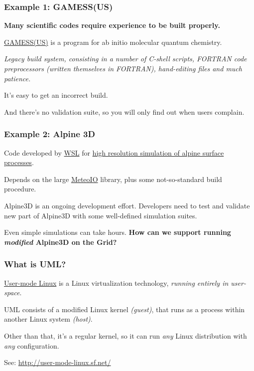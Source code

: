 \documentclass{beamer}
\begin{document}
\begin{frame}
  \frametitle{Example 1: GAMESS(US)}
  \label{sec:3}
  
  \textbf{Many scientific codes require experience to be built properly.}

  \+
  \href{http://www.msg.ameslab.gov/gamess/}{GAMESS(US)} is a program
  for ab initio molecular quantum chemistry.

  \+
  \emph{Legacy build system, consisting in a number of C-shell scripts,
  FORTRAN code preprocessors (written themselves in FORTRAN),
  hand-editing files and much patience.}

  \+
  It's easy to get an incorrect build.

  \+
  And there's no validation suite, so you will only find out when
  users complain.
\end{frame}






\begin{frame}
  \frametitle{Example 2: Alpine 3D}
  \label{sec:5}
  
  Code developed by \href{http://www.wsl.ch/}{WSL} for
  \href{http://www.slf.ch/ueber/organisation/schnee_permafrost/projekte/Alpine/index_EN}
  {high resolution simulation of alpine surface processes}.

  \+
  Depends on the large
  \href{http://www.slideshare.net/GEOFRAMEcafe/meteo-io-introduction}{MeteoIO}
  library, plus some not-so-standard build procedure.
  
  \+
  Alpine3D is an ongoing development effort.  Developers need to test
  and validate new part of Alpine3D with some well-defined simulation
  suites.

  \+
  Even simple simulations can take hours. \textbf{How can we support
    running \emph{modified} Alpine3D on the Grid?}
\end{frame}


\begin{frame}
  \frametitle{What is UML?}
  \label{sec:6}
  \href{http://user-mode-linux.sf.net/}{User-mode Linux} is a Linux virtualization technology, 
  \emph{running entirely in user-space}.

  \+
  UML consists of a modified Linux kernel \emph{(guest)}, that runs as a
  process within another Linux system \emph{(host)}.
  
  \+
  Other than that, it's a regular kernel, so it can run \emph{any} Linux
  distribution with \emph{any} configuration.

  \+
  {See: \url{http://user-mode-linux.sf.net/}}
\end{frame}
\end{document}
